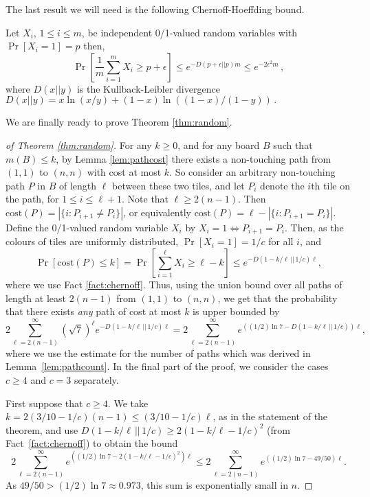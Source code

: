 \documentclass[a4paper,11pt]{llncs}
\newcommand{\cost}{\text{cost}}
\newcounter{l}
\renewcommand{\geq}{\geqslant}
\renewcommand{\leq}{\leqslant}
\begin{document}
\noindent The last result we will need is the following Chernoff-Hoeffding bound.

\begin{fact}
    \label{fact:chernoff}
    Let $X_i$, $1 \leq i \leq m$, be independent 0/1-valued random variables with $\Pr[X_i=1]=p$ then, \[\Pr\left[\frac{1}{m}\sum_{i=1}^m X_i \geq p + \epsilon\right] \leq e^{-D(p + \epsilon||p) m} \leq e^{-2\epsilon^2 m}\,,\] where $D(x||y)$ is the Kullback-Leibler divergence $D(x||y) = x \ln (x/y) + (1-x)\ln((1-x)/(1-y))\,.$
\end{fact}

\noindent We are finally ready to prove Theorem \ref{thm:random}.

\begin{proof}[of Theorem \ref{thm:random}]
    For any $k \geq 0$, and for any board $B$ such that $m(B)\leq k$, by Lemma \ref{lem:pathcost} there exists a non-touching path from $(1,1)$ to $(n,n)$ with cost at most $k$. So consider an arbitrary non-touching path $P$ in $B$ of length $\ell$ between these two tiles, and let $P_i$ denote the $i$th tile on the path, for $1 \leq i \leq \ell + 1$. Note that $\ell\geq 2(n-1)$. Then $\cost(P)=|\{i:P_{i+1} \neq P_i\}|$, or equivalently $\cost(P)=\ell - |\{i:P_{i+1} = P_i\}|$. Define the 0/1-valued random variable $X_i$ by $X_i=1 \Leftrightarrow P_{i+1} = P_i$. Then, as the colours of tiles are uniformly distributed, $\Pr[X_i=1] = 1/c$ for all $i$, and
\[ \Pr[\cost(P) \leq k] = \Pr\left[\sum_{i=1}^\ell X_i \geq \ell-k\right] \leq e^{-D(1-k/\ell\,||\,1/c)\ell}, \]
where we use Fact \ref{fact:chernoff}. Thus, using the union bound over all paths of length at least $2(n-1)$ from $(1,1)$ to $(n,n)$, we get that the probability that there exists {\em any} path of cost at most $k$ is upper bounded by
\begin{equation}
    \label{eqn:union}
    2 \sum_{\ell=2(n-1)}^{\infty} (\sqrt{7})^\ell e^{-D(1-k/\ell\,||\,1/c)\ell} = 2 \sum_{\ell=2(n-1)}^{\infty} e^{((1/2)\ln 7 - D(1-k/\ell\,||\,1/c))\ell},
    \end{equation}
where we use the estimate for the number of paths which was derived in Lemma~\ref{lem:pathcount}. In the final part of the proof, we consider the cases $c \geq 4$ and $c=3$ separately.

    First suppose that $c\geq 4$. We take $k = 2(3/10-1/c)(n-1) \leq (3/10-1/c)\ell$, as in the statement of the theorem, and use $D(1-k/\ell\,||\,1/c) \geq 2(1-k/\ell-1/c)^2$ (from Fact~\ref{fact:chernoff}) to obtain the bound
\[ 2 \sum_{\ell=2(n-1)}^{\infty} e^{((1/2)\ln 7 - 2(1-k/\ell-1/c)^2)\ell} \leq 2 \sum_{\ell=2(n-1)}^{\infty} e^{((1/2)\ln 7 - 49/50)\ell}. \]
As $49/50 > (1/2)\ln 7 \approx 0.973$, this sum is exponentially small in $n$.


\end{proof}
\end{document}
